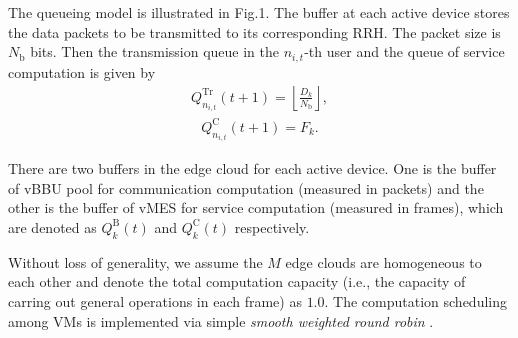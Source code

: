 The queueing model is illustrated in Fig.1.
The buffer at each active device stores the data packets to be transmitted to its corresponding RRH. The packet size is ${N_\mathrm{b}}$ bits. Then the transmission queue in the $n_{i,t}$-th user and the queue of service computation is given by
\begin{align}
    Q_{n_{i,t}}^{\mathrm{Tr}}(t+1)=\left\lfloor\frac{D_{k}}{N_\mathrm{b}}\right\rfloor,
\end{align}
\begin{align}
    Q_{n_{i,t}}^{\mathrm{C}}(t+1)=F_{k}.
\end{align}

There are two buffers in the edge cloud for each active device. One is the buffer of vBBU pool for communication computation (measured in packets) and the other is the buffer of vMES for service computation (measured in frames), which are denoted as $Q_{k}^{\mathrm{B}}(t)$ and $Q_{k}^{\mathrm{C}}(t)$ respectively.

Without loss of generality, we assume the $M$ edge clouds are homogeneous to each other and denote the total computation capacity (i.e., the capacity of carring out general operations in each frame) as $1.0$.
The computation scheduling among VMs is implemented via simple \emph{smooth weighted round robin} .
%
